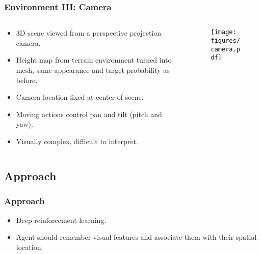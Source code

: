 \begin{frame}
    \frametitle{Environment III: Camera}
    \begin{columns}
        \begin{column}{0.5\textwidth}
            \begin{itemize}
                \item 3D scene viewed from a perspective projection camera.
                \item Height map from terrain environment turned into mesh, same appearance and target probability as before.
                \item Camera location fixed at center of scene.
                \item Moving actions control pan and tilt (pitch and yaw).
                \item Visually complex, difficult to interpret.
            \end{itemize}
        \end{column}
        \begin{column}{0.5\textwidth}
            \begin{figure}
                \centering
                \texttt{[image: figures/camera.pdf]}
            \end{figure}
        \end{column}
    \end{columns}
\end{frame}

\subsection{Approach}

\begin{frame}
    \frametitle{Approach}

    \begin{itemize}
        \item Deep reinforcement learning.
        \item Agent should remember visual features and associate them with their spatial location.
    \end{itemize}
\end{frame}

